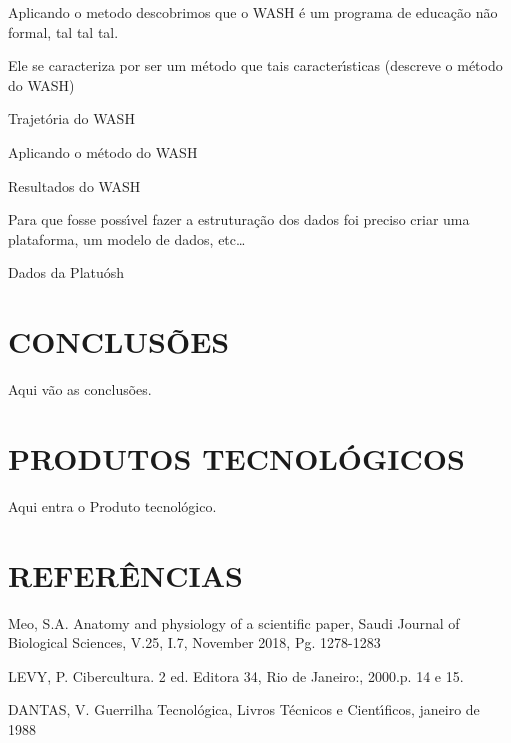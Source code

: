 \documentclass[
12pt,		%
openright,	%
twoside,  %
a4paper,			%
chapter=TITLE,		%
english,			%
french,				%
spanish,			%
brazil				%
]{USPSC-classe/USPSC}
\begin{document}
 Aplicando o metodo descobrimos que o WASH \'e um programa de educa\c{c}\~ao n\~ao formal, tal tal tal.


Ele se caracteriza por ser um m\'etodo que tais caracter\'{\i}sticas (descreve o m\'etodo do WASH)


Trajet\'oria do WASH


Aplicando o m\'etodo do WASH


Resultados do WASH


Para que fosse poss\'{\i}vel fazer a estrutura\c{c}\~ao dos dados foi preciso criar uma plataforma, um modelo de dados, etc…


Dados da Platu\'osh


\chapter[CONCLUS\~OES]{CONCLUS\~OES}\label{CONCLUS\~OES}
Aqui v\~ao as conclus\~oes.


\chapter[PRODUTOS TECNOL\'OGICOS]{PRODUTOS TECNOL\'OGICOS}\label{PRODUTOS TECNOL\'OGICOS}
Aqui entra o Produto tecnol\'ogico.


\chapter[REFER\^ENCIAS]{REFER\^ENCIAS}\label{REFER\^ENCIAS}
\begin{flushleft}
\begin{flushleft}
[MEO, 2018] Meo, S.A. Anatomy and physiology of a scientific paper, Saudi Journal of Biological Sciences, V.25, I.7, November 2018, Pg. 1278-1283
\end{flushleft}


\end{flushleft}


\begin{flushleft}
\begin{flushleft}
[LEVY, 2000] LEVY, P. Cibercultura. 2 ed. Editora 34,  Rio de Janeiro:, 2000.p. 14 e 15.
\end{flushleft}


\end{flushleft}


\begin{flushleft}
\begin{flushleft}
[DANTAS, 1988] DANTAS, V. Guerrilha Tecnol\'ogica, Livros T\'ecnicos e Cient\'{\i}ficos, janeiro de 1988
\end{flushleft}


\end{flushleft}
\end{document}
